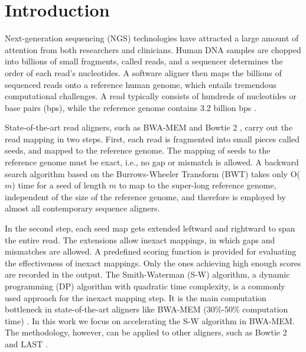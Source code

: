 \section{Introduction} 
\label{sec:introduction}

Next-generation sequencing (NGS) technologies have attracted a large amount of attention from both researchers and clinicians. 
Human DNA samples are chopped into billions of small fragments, called reads, and a sequencer determines the order of each read's nucleotides. 
A software aligner then maps the billions of sequenced reads onto a reference human genome, which entails tremendous computational challenges.
A read typically consists of hundreds of nucleotides or base pairs (bps), while the reference genome contains 3.2 billion bps \cite{Mardis2008}.

State-of-the-art read aligners, such as BWA-MEM \cite{BWA-MEM} and Bowtie 2 \cite{Bowtie2}, 
carry out the read mapping in two steps. 
First, each read is fragmented into small pieces called seeds, and mapped to the reference genome. 
The mapping of seeds to the reference genome must be exact, i.e., no gap or mismatch is allowed. 
A backward search algorithm based on the Burrows-Wheeler Transform (BWT) \cite{BWT} takes only O($m$) time for a seed of length $m$ to map to the super-long reference genome, independent of the size of the reference genome, and therefore is employed by almost all contemporary sequence aligners.

In the second step, each seed map gets extended leftward and rightward to span the entire read. 
The extensions allow inexact mappings, in which gaps and mismatches are allowed. A predefined scoring function is provided for evaluating the effectiveness of inexact mappings. Only the ones achieving high enough scores are recorded in the output. 
The Smith-Waterman (S-W) algorithm, a dynamic programming (DP) algorithm with quadratic time complexity, is a commonly used approach for the inexact mapping step. 
It is the main computation bottleneck in state-of-the-art aligners like BWA-MEM (30\%-50\% computation time) \cite{BWA-MEM}. 
In this work we focus on accelerating the S-W algorithm in BWA-MEM. The methodology, however, can be applied to other aligners, such as Bowtie 2 \cite{Bowtie2} and LAST \cite{LAST}. 

